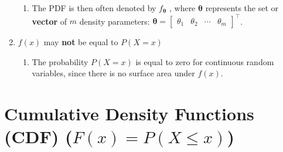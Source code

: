 \begin{enumerate}
\begin{enumerate}
        \item The PDF is then often denoted by $f_{\bm{\theta}}$ , where $\bm{\theta}$ represents the set or \textbf{vector} of $m$ density parameters: 
        $\bm{\theta} = 
        \begin{bmatrix}
            \theta_1 & \theta_2 & \cdots &\theta_m
        \end{bmatrix} 
        ^\top
        $.
        \hfill \cite{statistics/book/Statistics-for-Data-Scientists/Maurits-Kaptein}
    \end{enumerate}

    \item  $f(x)$ may \textbf{not} be equal to $P(X = x)$
    \hfill \cite{statistics/book/Statistics-for-Data-Scientists/Maurits-Kaptein}
    \begin{enumerate}
        \item The probability $P(X = x)$ is equal to zero for continuous random variables, since there is no surface area under $f (x)$.
        \hfill \cite{statistics/book/Statistics-for-Data-Scientists/Maurits-Kaptein}
    \end{enumerate}
\end{enumerate}




\section{Cumulative Density Functions (CDF) ($F(x) = P(X \leq x)$)}

